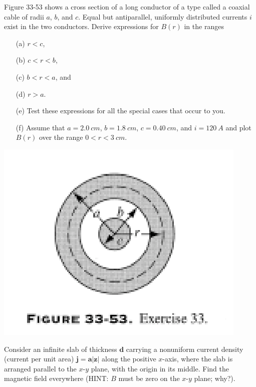 \documentclass[12pt,letterpaper,boxed,cm]{hmcpset}
\begin{document}

\begin{problem}[33-P8]
	Figure 33-53 shows a cross section of a long conductor of a type called a coaxial cable of radii $a$, $b$, and $c$. Equal but antiparallel, uniformly distributed currents $i$ exist in the two conductors. Derive expressions for $B(r)$ in the ranges
	\begin{enumerate}
		\item[(a)] $r < c$, 
		\item[(b)] $c < r < b$, 
		\item[(c)] $b < r < a$,  and
		\item[(d)] $r > a$.
		\item[(e)] Test these expressions for all the special cases that occur to you.
		\item[(f)] Assume that $a = \SI{2.0}{cm}$, $b = \SI{1.8}{cm}$, $c = \SI{0.40}{cm}$, and $i = \SI{120}{A}$ and plot $B(r)$ over the range $0 < r < \SI{3}{cm}$.
	\end{enumerate}
	\begin{center}
		\includegraphics[scale=0.7]{01.png}	
	\end{center}
\end{problem}
\begin{solution}	
\end{solution}
\newpage

\begin{problem}[SUP18]	
Consider an infinite slab of thickness $\mathbf{d}$ carrying a nonuniform current density (current per unit area) $\mathbf{j} = \mathbf{a} |\mathbf{z}|$ along the positive $x$-axis, where the slab is arranged parallel to the $x$-$y$ plane, with the origin in its middle. Find the magnetic field everywhere (HINT: $B$ must be zero on the $x$-$y$ plane; why?).
\end{problem}
\begin{solution}
\end{solution}
\newpage
\end{document}
